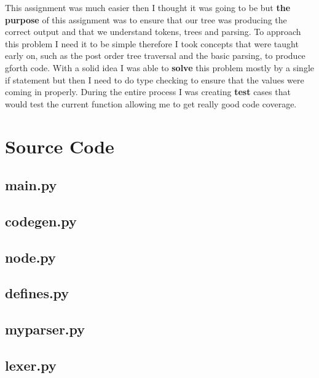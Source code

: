 \documentclass[letterpaper,10pt]{article}
\begin{document}
\begin{mdframed}[style=MyFrame]
This assignment was much easier then I thought it was going to be but \textbf{the purpose} of this assignment was to ensure that our tree was producing the correct output and that we understand tokens, trees and parsing. To approach this problem I need it to be simple therefore I took concepts that were taught early on, such as the post order tree traversal and the basic parsing, to produce gforth code. With a solid idea I was able to \textbf{solve} this problem mostly by a single if statement but then I need to do type checking to ensure that the values were coming in properly. During the entire process I was creating\textbf{ test} cases that would test the current function allowing me to get really good code coverage. 

\end{mdframed}



\newpage
\section{Source Code}
\subsection{main.py}

\subsection{codegen.py}

\subsection{node.py}

\subsection{defines.py}

\subsection{myparser.py}

\subsection{lexer.py}

\end{document}
